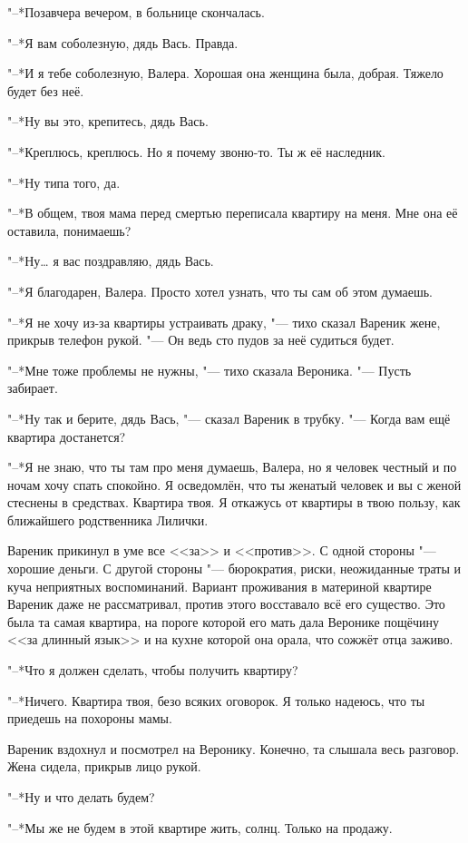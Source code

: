 "--*Позавчера вечером, в больнице скончалась.

"--*Я вам соболезную, дядь Вась.
Правда.

"--*И я тебе соболезную, Валера.
Хорошая она женщина была, добрая.
Тяжело будет без неё.

"--*Ну вы это, крепитесь, дядь Вась.

"--*Креплюсь, креплюсь.
Но я почему звоню-то.
Ты ж её наследник.

"--*Ну типа того, да.

"--*В общем, твоя мама перед смертью переписала квартиру на меня.
Мне она её оставила, понимаешь?

"--*Ну\ldots{} я вас поздравляю, дядь Вась.

"--*Я благодарен, Валера.
Просто хотел узнать, что ты сам об этом думаешь.

"--*Я не хочу из-за квартиры устраивать драку, "--- тихо сказал Вареник жене, прикрыв телефон рукой.
"--- Он ведь сто пудов за неё судиться будет.

"--*Мне тоже проблемы не нужны, "--- тихо сказала Вероника.
"--- Пусть забирает.

"--*Ну так и берите, дядь Вась, "--- сказал Вареник в трубку.
"--- Когда вам ещё квартира достанется?

"--*Я не знаю, что ты там про меня думаешь, Валера, но я человек честный и по ночам хочу спать спокойно.
Я осведомлён, что ты женатый человек и вы с женой стеснены в средствах.
Квартира твоя.
Я откажусь от квартиры в твою пользу, как ближайшего родственника Лилички.

Вареник прикинул в уме все <<за>> и <<против>>.
С одной стороны "--- хорошие деньги.
С другой стороны "--- бюрократия, риски, неожиданные траты и куча неприятных воспоминаний.
Вариант проживания в материной квартире Вареник даже не рассматривал, против этого восставало всё его существо.
Это была та самая квартира, на пороге которой его мать дала Веронике пощёчину <<за длинный язык>> и на кухне которой она орала, что сожжёт отца заживо.

"--*Что я должен сделать, чтобы получить квартиру?

"--*Ничего.
Квартира твоя, безо всяких оговорок.
Я только надеюсь, что ты приедешь на похороны мамы.

Вареник вздохнул и посмотрел на Веронику.
Конечно, та слышала весь разговор.
Жена сидела, прикрыв лицо рукой.

"--*Ну и что делать будем?

"--*Мы же не будем в этой квартире жить, солнц.
Только на продажу.

